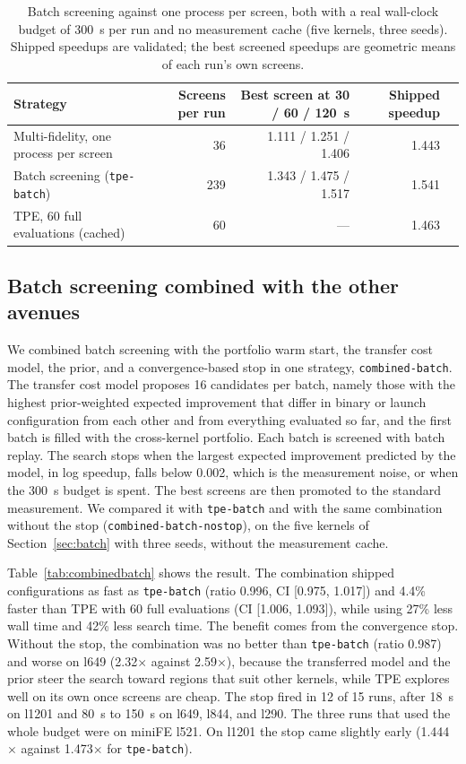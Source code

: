 \documentclass[10pt]{article}
\newcommand{\x}{\ensuremath{\times}}
\newcommand{\code}[1]{\texttt{#1}}
\begin{document}
\begin{table}[t]
\centering
\caption{Batch screening against one process per screen, both with a real
wall-clock budget of 300~s per run and no measurement cache (five kernels,
three seeds). Shipped speedups are validated; the best screened speedups are
geometric means of each run's own screens.}
\label{tab:batch}
\small
\begin{tabular}{lrrrr}
\toprule
Strategy & Screens per run & Best screen at 30 / 60 / 120~s & Shipped speedup \\
\midrule
Multi-fidelity, one process per screen & 36 & 1.111 / 1.251 / 1.406 & 1.443 \\
Batch screening (\code{tpe-batch}) & 239 & 1.343 / 1.475 / 1.517 & 1.541 \\
TPE, 60 full evaluations (cached) & 60 & --- & 1.463 \\
\bottomrule
\end{tabular}
\end{table}


\subsection{Batch screening combined with the other avenues}
\label{sec:combinedbatch}
We combined batch screening with the portfolio warm start, the transfer cost
model, the prior, and a convergence-based stop in one strategy,
\code{combined-batch}. The transfer cost model proposes 16 candidates per
batch, namely those with the highest prior-weighted expected improvement that
differ in binary or launch configuration from each other and from everything
evaluated so far, and the first batch is filled with the cross-kernel
portfolio. Each batch is screened with batch replay. The search stops when the
largest expected improvement predicted by the model, in log speedup, falls
below 0.002, which is the measurement noise, or when the 300~s budget is
spent. The best screens are then promoted to the standard measurement. We
compared it with \code{tpe-batch} and with the same combination without the
stop (\code{combined-batch-nostop}), on the five kernels of
Section~\ref{sec:batch} with three seeds, without the measurement cache.

Table~\ref{tab:combinedbatch} shows the result. The combination shipped
configurations as fast as \code{tpe-batch} (ratio 0.996, CI [0.975, 1.017])
and 4.4\% faster than TPE with 60 full evaluations (CI [1.006, 1.093]), while
using 27\% less wall time and 42\% less search time. The benefit comes from the
convergence stop. Without the stop, the combination was no better than
\code{tpe-batch} (ratio 0.987) and worse on l649 (2.32\x{} against 2.59\x{}),
because the transferred model and the prior steer the search toward regions
that suit other kernels, while TPE explores well on its own once screens are
cheap. The stop fired in 12 of 15 runs, after 18~s on l1201 and 80~s to 150~s
on l649, l844, and l290. The three runs that used the whole budget were on
miniFE l521. On l1201 the stop came slightly early (1.444\x{} against
1.473\x{} for \code{tpe-batch}).
\end{document}
